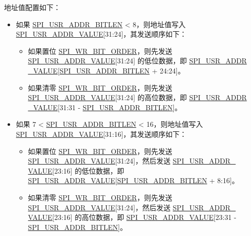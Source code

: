 \documentclass[main\_\_CN.tex]{subfiles}
\begin{document}
地址值配置如下：
\begin{itemize}
\item 如果 \hyperref[fielddesc:SPIUSRADDRBITLEN]{SPI\_USR\_ADDR\_BITLEN} < 8，则地址值写入 \hyperref[fielddesc:SPIUSRADDRVALUE]{SPI\_USR\_ADDR\_VALUE}[31:24]，其发送顺序如下：
\begin{itemize}
    \item 如果置位 \hyperref[fielddesc:SPIWRBITORDER]{SPI\_WR\_BIT\_ORDER}，则先发送 \hyperref[fielddesc:SPIUSRADDRVALUE]{SPI\_USR\_ADDR\_VALUE}[31:24] 的低位数据，即 \hyperref[fielddesc:SPIUSRADDRVALUE]{SPI\_USR\_ADDR\\\_VALUE}[\hyperref[fielddesc:SPIUSRADDRBITLEN]{SPI\_USR\_ADDR\_BITLEN} + 24:24]。
    \item 如果清零 \hyperref[fielddesc:SPIWRBITORDER]{SPI\_WR\_BIT\_ORDER}，则先发送 \hyperref[fielddesc:SPIUSRADDRVALUE]{SPI\_USR\_ADDR\_VALUE}[31:24] 的高位数据，即 \hyperref[fielddesc:SPIUSRADDRVALUE]{SPI\_USR\_ADDR\\\_VALUE}[31:31 - \hyperref[fielddesc:SPIUSRADDRBITLEN]{SPI\_USR\_ADDR\_BITLEN}]。
\end{itemize}

\item  如果 7 < \hyperref[fielddesc:SPIUSRADDRBITLEN]{SPI\_USR\_ADDR\_BITLEN} < 16，则地址值写入 \hyperref[fielddesc:SPIUSRADDRVALUE]{SPI\_USR\_ADDR\_VALUE}[31:16]，其发送顺序如下：
\begin{itemize}
    \item 如果置位 \hyperref[fielddesc:SPIWRBITORDER]{SPI\_WR\_BIT\_ORDER}，则先发送 \hyperref[fielddesc:SPIUSRADDRVALUE]{SPI\_USR\_ADDR\_VALUE}[31:24]，然后发送 \hyperref[fielddesc:SPIUSRADDRVALUE]{SPI\_USR\_ADDR\_\\VALUE}[23:16] 的低位数据，即 \hyperref[fielddesc:SPIUSRADDRVALUE]{SPI\_USR\_ADDR\_VALUE}[\hyperref[fielddesc:SPIUSRADDRBITLEN]{SPI\_USR\_ADDR\_BITLEN} + 8:16]。
    \item 如果清零 \hyperref[fielddesc:SPIWRBITORDER]{SPI\_WR\_BIT\_ORDER}，则先发送 \hyperref[fielddesc:SPIUSRADDRVALUE]{SPI\_USR\_ADDR\_VALUE}[31:24]，然后发送 \hyperref[fielddesc:SPIUSRADDRVALUE]{SPI\_USR\_ADDR\_\\VALUE}[23:16] 的高位数据，即 \hyperref[fielddesc:SPIUSRADDRVALUE]{SPI\_USR\_ADDR\_VALUE}[23:31 - \hyperref[fielddesc:SPIUSRADDRBITLEN]{SPI\_USR\_ADDR\_BITLEN}]。
\end{itemize}


\end{itemize}
\end{document}
